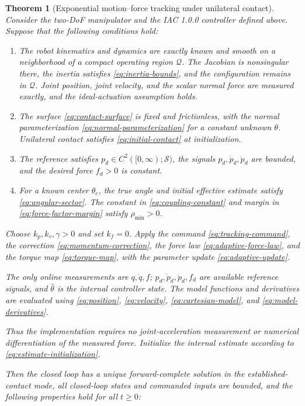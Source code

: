 \documentclass[10pt,journal,letterpaper]{IEEEtran}
\newtheorem{theorem}{Theorem}
\begin{document}
\begin{theorem}[Exponential motion--force tracking under unilateral contact] Consider the two-DoF manipulator and the IAC 1.0.0 controller defined above. Suppose that the following conditions hold:

\begin{enumerate}
\item The robot kinematics and dynamics are exactly known and smooth on a neighborhood of a compact operating region $\mathcal Q$. The Jacobian is nonsingular there, the inertia satisfies \eqref{eq:inertia-bounds}, and the configuration remains in $\mathcal Q$. Joint position, joint velocity, and the scalar normal force are measured exactly, and the ideal-actuation assumption holds.
\item The surface \eqref{eq:contact-surface} is fixed and frictionless, with the normal parameterization \eqref{eq:normal-parameterization} for a constant unknown $\theta$. Unilateral contact satisfies \eqref{eq:initial-contact} at initialization.
\item The reference satisfies $p_d\in C^2([0,\infty);\mathcal S)$, the signals $p_d,\dot p_d,\ddot p_d$ are bounded, and the desired force $f_d>0$ is constant.
\item For a known center $\theta_c$, the true angle and initial effective estimate satisfy \eqref{eq:angular-sector}. The constant in \eqref{eq:coupling-constant} and margin in \eqref{eq:force-factor-margin} satisfy $\rho_{\min}>0$.

\end{enumerate}

Choose $k_p,k_v,\gamma>0$ and set $k_f=0$. Apply the command \eqref{eq:tracking-command}, the correction \eqref{eq:momentum-correction}, the force law \eqref{eq:adaptive-force-law}, and the torque map \eqref{eq:torque-map}, with the parameter update \eqref{eq:adaptive-update}.

The only online measurements are $q,\dot q,f$; $p_d,\dot p_d,\ddot p_d,f_d$ are available reference signals, and $\hat\theta$ is the internal controller state. The model functions and derivatives are evaluated using \eqref{eq:position}, \eqref{eq:velocity}, \eqref{eq:cartesian-model}, and \eqref{eq:model-derivatives}.

Thus the implementation requires no joint-acceleration measurement or numerical differentiation of the measured force. Initialize the internal estimate according to \eqref{eq:estimate-initialization}.

Then the closed loop has a unique forward-complete solution in the established-contact mode, all closed-loop states and commanded inputs are bounded, and the following properties hold for all $t\geq0$:


\end{theorem}
\end{document}
